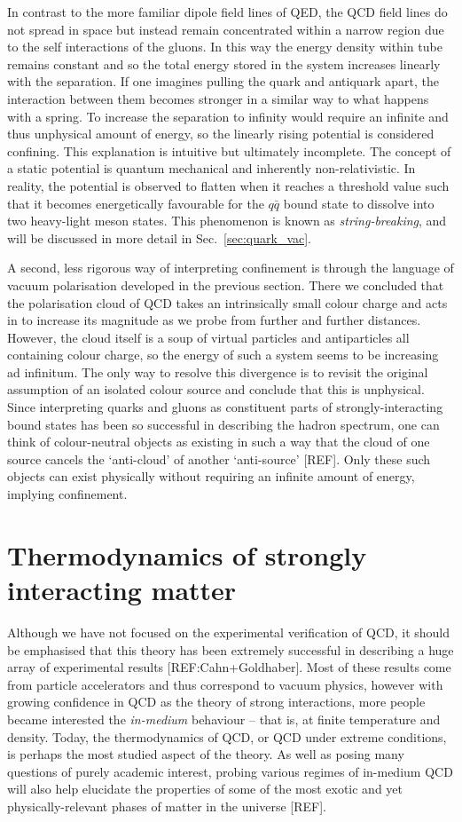 \documentclass[12pt, a4paper, twoside]{book}
\begin{document}
In contrast to the more familiar dipole field lines of QED, the QCD field lines do not spread in space but instead remain concentrated within a narrow region due to the self interactions of the gluons. In this way the energy density within tube remains constant and so the total energy stored in the system increases linearly with the separation. If one imagines pulling the quark and antiquark apart, the interaction between them becomes stronger in a similar way to what happens with a spring. To increase the separation to infinity would require an infinite and thus unphysical amount of energy, so the linearly rising potential is considered confining. This explanation is intuitive but ultimately incomplete. The concept of a static potential is quantum mechanical and inherently non-relativistic. In reality, the potential is observed to flatten when it reaches a threshold value such that it becomes energetically favourable for the \(q\bar{q}\) bound state to dissolve into two heavy-light meson states. This phenomenon is known as \emph{string-breaking}, and will be discussed in more detail in Sec.~\ref{sec:quark_vac}.

A second, less rigorous way of interpreting confinement is through the language of vacuum polarisation developed in the previous section. There we concluded that the polarisation cloud of QCD takes an intrinsically small colour charge and acts in to increase its magnitude as we probe from further and further distances. However, the cloud itself is a soup of virtual particles and antiparticles all containing colour charge, so the energy of such a system seems to be increasing ad infinitum. The only way to resolve this divergence is to revisit the original assumption of an isolated colour source and conclude that this is unphysical. Since interpreting quarks and gluons as constituent parts of strongly-interacting bound states has been so successful in describing the hadron spectrum, one can think of colour-neutral objects as existing in such a way that the cloud of one source cancels the `anti-cloud' of another `anti-source' [REF]. Only these such objects can exist physically without requiring an infinite amount of energy, implying confinement.
\section{Thermodynamics of strongly interacting matter}
\label{sec:QCD_therm}
\onehalfspacing
Although we have not focused on the experimental verification of QCD, it should be emphasised that this theory has been extremely successful in describing a huge array of experimental results [REF:Cahn+Goldhaber]. Most of these results come from particle accelerators and thus correspond to vacuum physics, however with growing confidence in QCD as the theory of strong interactions, more people became interested the \emph{in-medium} behaviour -- that is, at finite temperature and density. Today, the thermodynamics of QCD, or QCD under extreme conditions, is perhaps the most studied aspect of the theory. As well as posing many questions of purely academic interest, probing various regimes of in-medium QCD will also help elucidate the properties of some of the most exotic and yet physically-relevant phases of matter in the universe [REF].
\end{document}
